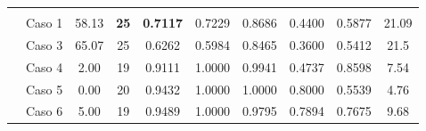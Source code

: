 \begin{table}
{\begin{tabular}{cccccccccc}
			\multicolumn{10}{c}{}                                                                                                                                                                                                                                                                                                                                                                                                                                                                   \\
			\multicolumn{1}{c|}{}                      & {\color[HTML]{003532} Caso 1} & {\color[HTML]{003532} 58.13}                                         & {\color[HTML]{9A0000} \textbf{25}}                                 & {\color[HTML]{9A0000} \textbf{0.7117}}                  & {\color[HTML]{003532} 0.7229} & {\color[HTML]{003532} 0.8686} & {\color[HTML]{003532} 0.4400} & {\color[HTML]{003532} 0.5877} & {\color[HTML]{003532} 21.09}                                         \\
			\multicolumn{1}{c|}{}                      & Caso 3                        & 65.07                                                                & 25                                                                 & 0.6262                                                  & 0.5984                        & 0.8465                        & 0.3600                        & 0.5412                        & 21.5                                                                 \\
			\multicolumn{1}{c|}{}                      & {\color[HTML]{003532} Caso 4} & {\color[HTML]{003532} 2.00}                                          & {\color[HTML]{003532} 19}                                          & {\color[HTML]{003532} 0.9111}                           & {\color[HTML]{003532} 1.0000} & {\color[HTML]{003532} 0.9941} & {\color[HTML]{003532} 0.4737} & {\color[HTML]{003532} 0.8598} & {\color[HTML]{003532} 7.54}                                          \\
			\multicolumn{1}{c|}{}                      & Caso 5                        & 0.00                                                                 & 20                                                                 & 0.9432                                                  & 1.0000                        & 1.0000                        & 0.8000                        & 0.5539                        & 4.76                                                                 \\
			\multicolumn{1}{c|}{}                      & {\color[HTML]{003532} Caso 6} & {\color[HTML]{003532} 5.00}                                          & {\color[HTML]{003532} 19}                                          & {\color[HTML]{003532} 0.9489}                           & {\color[HTML]{003532} 1.0000} & {\color[HTML]{003532} 0.9795} & {\color[HTML]{003532} 0.7894} & {\color[HTML]{003532} 0.7675} & {\color[HTML]{003532} 9.68}                                          \\

\end{tabular}}
\end{table}
